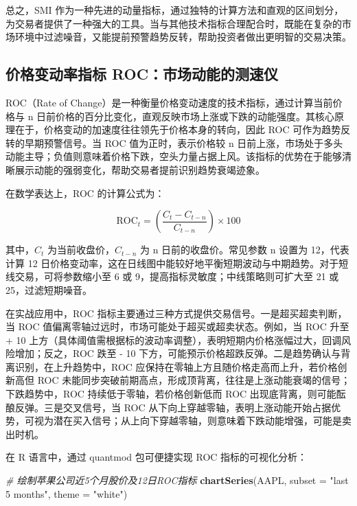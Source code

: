\documentclass[]{ctexbook}
\newenvironment{Shaded}{\begin{snugshade}}{\end{snugshade}}
\newcommand{\AttributeTok}[1]{\textcolor[rgb]{0.13,0.29,0.53}{#1}}
\newcommand{\CommentTok}[1]{\textcolor[rgb]{0.56,0.35,0.01}{\textit{#1}}}
\newcommand{\FunctionTok}[1]{\textcolor[rgb]{0.13,0.29,0.53}{\textbf{#1}}}
\newcommand{\NormalTok}[1]{#1}
\newcommand{\StringTok}[1]{\textcolor[rgb]{0.31,0.60,0.02}{#1}}
\begin{document}
总之，SMI 作为一种先进的动量指标，通过独特的计算方法和直观的区间划分，为交易者提供了一种强大的工具。当与其他技术指标合理配合时，既能在复杂的市场环境中过滤噪音，又能提前预警趋势反转，帮助投资者做出更明智的交易决策。

\subsection{价格变动率指标 ROC：市场动能的测速仪}\label{ux4ef7ux683cux53d8ux52a8ux7387ux6307ux6807-rocux5e02ux573aux52a8ux80fdux7684ux6d4bux901fux4eea}

ROC（Rate of Change）是一种衡量价格变动速度的技术指标，通过计算当前价格与 n 日前价格的百分比变化，直观反映市场上涨或下跌的动能强度。其核心原理在于，价格变动的加速度往往领先于价格本身的转向，因此 ROC 可作为趋势反转的早期预警信号。当 ROC 值为正时，表示价格较 n 日前上涨，市场处于多头动能主导；负值则意味着价格下跌，空头力量占据上风。该指标的优势在于能够清晰展示动能的强弱变化，帮助交易者提前识别趋势衰竭迹象。

在数学表达上，ROC 的计算公式为：

\[\text{ROC}_t = \left( \frac{C_t - C_{t-n}}{C_{t-n}} \right) \times 100\]

其中，\(C_t\) 为当前收盘价，\(C_{t-n}\) 为 n 日前的收盘价。常见参数 n 设置为 12，代表计算 12 日价格变动率，这在日线图中能较好地平衡短期波动与中期趋势。对于短线交易，可将参数缩小至 6 或 9，提高指标灵敏度；中线策略则可扩大至 21 或 25，过滤短期噪音。

在实战应用中，ROC 指标主要通过三种方式提供交易信号。一是超买超卖判断，当 ROC 值偏离零轴过远时，市场可能处于超买或超卖状态。例如，当 ROC 升至 + 10 上方（具体阈值需根据标的波动率调整），表明短期内价格涨幅过大，回调风险增加；反之，ROC 跌至 - 10 下方，可能预示价格超跌反弹。二是趋势确认与背离识别，在上升趋势中，ROC 应保持在零轴上方且随价格走高而上升，若价格创新高但 ROC 未能同步突破前期高点，形成顶背离，往往是上涨动能衰竭的信号；下跌趋势中，ROC 持续低于零轴，若价格创新低而 ROC 出现底背离，则可能酝酿反弹。三是交叉信号，当 ROC 从下向上穿越零轴，表明上涨动能开始占据优势，可视为潜在买入信号；从上向下穿越零轴，则意味着下跌动能增强，可能是卖出时机。

在 R 语言中，通过 quantmod 包可便捷实现 ROC 指标的可视化分析：

\begin{Shaded}
\begin{Highlighting}[]
\CommentTok{\# 绘制苹果公司近5个月股价及12日ROC指标  }
\FunctionTok{chartSeries}\NormalTok{(AAPL, }\AttributeTok{subset =} \StringTok{"last 5 months"}\NormalTok{, }\AttributeTok{theme =} \StringTok{"white"}\NormalTok{)  }
\end{Highlighting}
\end{Shaded}
\end{document}
